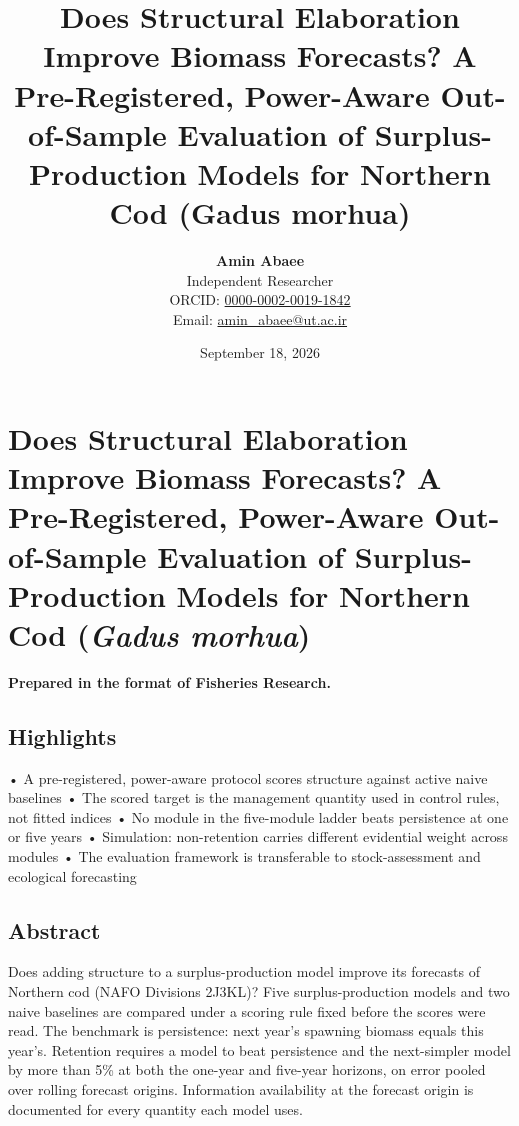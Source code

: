 \documentclass[11pt]{article}
\title{Does Structural Elaboration Improve Biomass Forecasts? A Pre-Registered, Power-Aware Out-of-Sample Evaluation of Surplus-Production Models for Northern Cod (Gadus morhua)}
\author{\textbf{Amin Abaee}\\ Independent Researcher\\[2pt] ORCID: \href{https://orcid.org/0000-0002-0019-1842}{0000-0002-0019-1842}\\ Email: \href{mailto:amin_abaee@ut.ac.ir}{amin_abaee@ut.ac.ir}}
\date{September 18, 2026}
\begin{document}
\maketitle

\section{\texorpdfstring{Does Structural Elaboration Improve Biomass
Forecasts? A Pre-Registered, Power-Aware Out-of-Sample Evaluation of
Surplus-Production Models for Northern Cod (\emph{Gadus
morhua})}{Does Structural Elaboration Improve Biomass Forecasts? A Pre-Registered, Power-Aware Out-of-Sample Evaluation of Surplus-Production Models for Northern Cod (Gadus morhua)}}\label{does-structural-elaboration-improve-biomass-forecasts-a-pre-registered-power-aware-out-of-sample-evaluation-of-surplus-production-models-for-northern-cod-gadus-morhua}

\textbf{Prepared in the format of Fisheries Research.}

\subsection{Highlights}\label{highlights}

• A pre-registered, power-aware protocol scores structure against active
naive baselines • The scored target is the management quantity used in
control rules, not fitted indices • No module in the five-module ladder
beats persistence at one or five years • Simulation: non-retention
carries different evidential weight across modules • The evaluation
framework is transferable to stock-assessment and ecological forecasting

\subsection{Abstract}\label{abstract}

Does adding structure to a surplus-production model improve its
forecasts of Northern cod (NAFO Divisions 2J3KL)? Five
surplus-production models and two naive baselines are compared under a
scoring rule fixed before the scores were read. The benchmark is
persistence: next year's spawning biomass equals this year's. Retention
requires a model to beat persistence and the next-simpler model by more
than 5\% at both the one-year and five-year horizons, on error pooled
over rolling forecast origins. Information availability at the forecast
origin is documented for every quantity each model uses.
\end{document}
